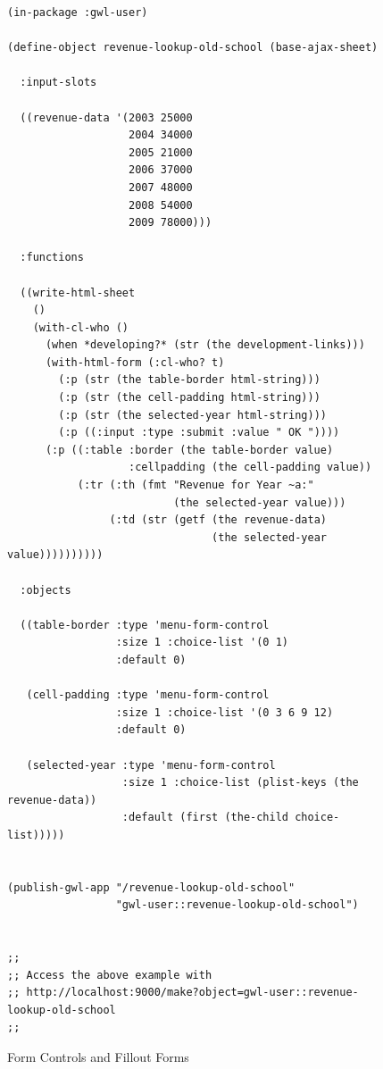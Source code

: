 \documentclass [11pt]{book}
\begin{document}
\begin{figure}
\begin{lrbox}{\boxedverb}
\begin{minipage}{\linewidth}
\tiny{

\begin{verbatim}(in-package :gwl-user)

(define-object revenue-lookup-old-school (base-ajax-sheet)
  
  :input-slots
  
  ((revenue-data '(2003 25000
                   2004 34000
                   2005 21000
                   2006 37000
                   2007 48000
                   2008 54000
                   2009 78000)))
  
  :functions
  
  ((write-html-sheet
    ()
    (with-cl-who ()
      (when *developing?* (str (the development-links)))
      (with-html-form (:cl-who? t)
        (:p (str (the table-border html-string)))
        (:p (str (the cell-padding html-string)))
        (:p (str (the selected-year html-string)))
        (:p ((:input :type :submit :value " OK "))))
      (:p ((:table :border (the table-border value)
                   :cellpadding (the cell-padding value))
           (:tr (:th (fmt "Revenue for Year ~a:" 
                          (the selected-year value)))
                (:td (str (getf (the revenue-data) 
                                (the selected-year value))))))))))

  :objects
  
  ((table-border :type 'menu-form-control
                 :size 1 :choice-list '(0 1)
                 :default 0)
   
   (cell-padding :type 'menu-form-control
                 :size 1 :choice-list '(0 3 6 9 12)
                 :default 0)
   
   (selected-year :type 'menu-form-control
                  :size 1 :choice-list (plist-keys (the revenue-data))
                  :default (first (the-child choice-list)))))
   

(publish-gwl-app "/revenue-lookup-old-school" 
                 "gwl-user::revenue-lookup-old-school")


;;
;; Access the above example with 
;; http://localhost:9000/make?object=gwl-user::revenue-lookup-old-school
;;

\end{verbatim}}
\end{minipage}
\end{lrbox}
\fbox{\usebox{\boxedverb}}

\caption{Form Controls and Fillout Forms}

\label{fig:gwl-3b}

\end{figure}
\end{document}

